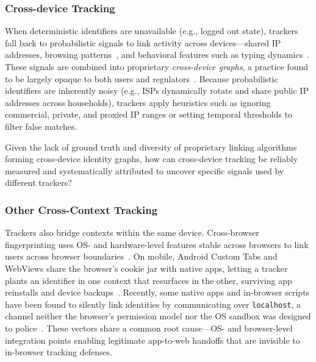 \subsubsection{Cross-device Tracking}
\label{sec:mixed-techniques-cross-device}

When deterministic identifiers are unavailable (e.g., logged out state), trackers fall back to probabilistic signals to link activity across devices---shared IP addresses, browsing patterns~\cite{caoCrossBrowserFingerprintingOS2017}, and behavioral features such as typing dynamics~\cite{yuanCrossdeviceTrackingIdentification2018}.
%
These signals are combined into proprietary \textit{cross-device graphs}, a practice found to be largely opaque to both users and regulators~\cite{zimmeckPrivacyAnalysisCrossdevice2017,brookmanCrossDeviceTrackingMeasurement2017}.
%
Because probabilistic identifiers are inherently noisy (e.g., ISPs dynamically rotate and share public IP addresses across households), trackers apply heuristics such as ignoring commercial, private, and proxied IP ranges or setting temporal thresholds to filter false matches.

\begin{opbox}
Given the lack of ground truth and diversity of proprietary linking algorithms forming cross-device identity graphs, how can cross-device tracking be reliably measured and systematically attributed to uncover specific signals used by different trackers?
\end{opbox}



\subsubsection{Other Cross-Context Tracking}
\label{sec:mixed-techniques-cross-context}

Trackers also bridge contexts within the same device.
%
Cross-browser fingerprinting uses OS- and hardware-level features stable across browsers to link users across browser boundaries~\cite{caoCrossBrowserFingerprintingOS2017}.
%
On mobile, Android Custom Tabs and WebViews share the browser's cookie jar with native apps, letting a tracker plants an identifier in one context that resurfaces in the other, surviving app reinstalls and device backups~\cite{wessels2025hytrack}.
%
Recently, some native apps and in-browser scripts have been found to silently link identities by communicating over \texttt{localhost}, a channel neither the browser's permission model nor the OS sandbox was designed to police~\cite{localmess-usenix-sec-26}.
%
These vectors share a common root cause---OS- and browser-level integration points enabling legitimate app-to-web handoffs that are invisible to in-browser tracking defenses.

